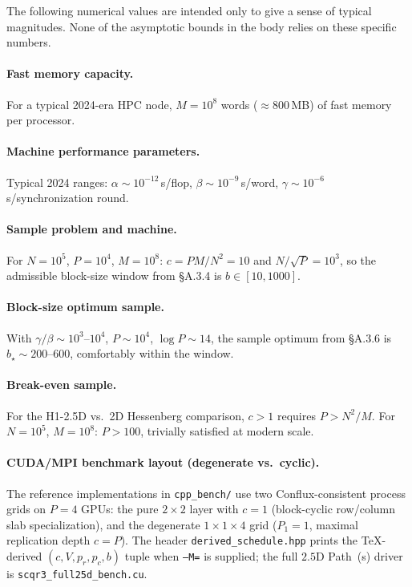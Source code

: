 \documentclass[11pt]{article}
\begin{document}
The following numerical values are intended only to give a sense of
typical magnitudes. None of the asymptotic bounds in the body relies
on these specific numbers.

\paragraph{Fast memory capacity.}
For a typical 2024-era HPC node, $M = 10^8$ words ($\approx 800$\,MB)
of fast memory per processor.

\paragraph{Machine performance parameters.}
Typical 2024 ranges:
$\alpha \sim 10^{-12}$\,s/flop,
$\beta \sim 10^{-9}$\,s/word,
$\gamma \sim 10^{-6}$\,s/synchronization round.

\paragraph{Sample problem and machine.}
For $N = 10^5$, $P = 10^4$, $M = 10^8$:
$c = PM/N^2 = 10$ and $N/\sqrt{P} = 10^3$, so the admissible
block-size window from \S A.3.4 is $b \in [10, 1000]$.

\paragraph{Block-size optimum sample.}
With $\gamma/\beta \sim 10^3$--$10^4$, $P \sim 10^4$, $\log P \sim 14$,
the sample optimum from \S A.3.6 is
$b_\star \sim 200$--$600$, comfortably within the window.

\paragraph{Break-even sample.}
For the H1-2.5D vs.\ 2D Hessenberg comparison, $c > 1$ requires
$P > N^2/M$. For $N = 10^5$, $M = 10^8$: $P > 100$, trivially
satisfied at modern scale.

\paragraph{CUDA/MPI benchmark layout (degenerate vs.\ cyclic).}
The reference implementations in \texttt{cpp\_bench/} use two
Conflux-consistent process grids on $P=4$ GPUs: the pure $2\times 2$
layer with $c=1$ (block-cyclic row/column slab specialization), and
the degenerate $1\times 1\times 4$ grid ($P_1=1$, maximal replication
depth $c=P$).  The header \texttt{derived\_schedule.hpp} prints the
TeX-derived $(c,V,p_r,p_c,b)$ tuple when \texttt{--M=} is supplied; the
full $2.5$D Path~(s) driver is \texttt{scqr3\_full25d\_bench.cu}.
\end{document}

